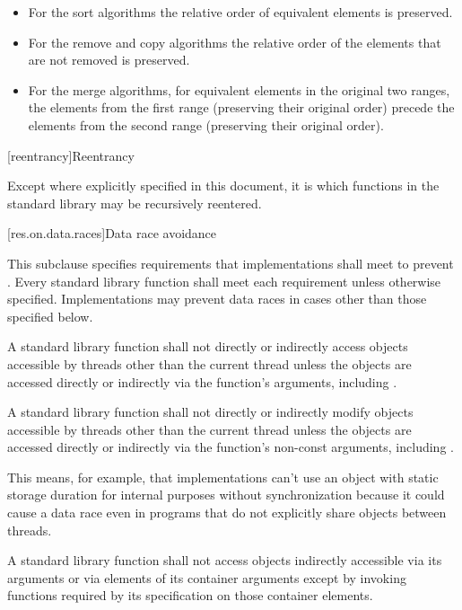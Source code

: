 \begin{itemize}
\item For the sort algorithms the relative order of equivalent
elements is preserved.

\item For the remove and copy algorithms the relative order of
the elements that are not removed is preserved.

\item For the merge algorithms, for equivalent elements in
the original two ranges, the elements from the first range (preserving their
original order) precede the elements from the second range (preserving their
original order).
\end{itemize}

[reentrancy]{Reentrancy}

\pnum
Except where explicitly specified in this document, it is  which functions in the \Cpp{} standard
library may be recursively reentered.

[res.on.data.races]{Data race avoidance}

\pnum
This subclause specifies requirements that implementations shall meet to prevent
.
Every standard library function shall meet each requirement unless otherwise specified.
Implementations may prevent data races in cases other than those specified below.

\pnum
A \Cpp{} standard library function shall not directly or indirectly access
objects accessible by threads other than the current thread
unless the objects are accessed directly or indirectly via the function's arguments,
including .

\pnum
A \Cpp{} standard library function shall not directly or indirectly modify
objects accessible by threads other than the current thread
unless the objects are accessed directly or indirectly via the function's non-const
arguments, including .

\pnum
\begin{note}
This means, for example, that implementations can't use an object with static storage duration for
internal purposes without synchronization because it could cause a data race even in
programs that do not explicitly share objects between threads.
\end{note}

\pnum
A \Cpp{} standard library function shall not access objects indirectly accessible via its
arguments or via elements of its container arguments except by invoking functions
required by its specification on those container elements.

